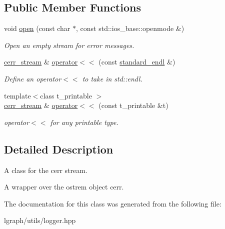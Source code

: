 \subsection*{Public Member Functions}
\begin{DoxyCompactItemize}
\item 
\hypertarget{classlgraph_1_1utils_1_1cerr__stream_aaec9df1b58756fcda596e29bbfcefeac}{void \hyperlink{classlgraph_1_1utils_1_1cerr__stream_aaec9df1b58756fcda596e29bbfcefeac}{open} (const char $\ast$, const std\-::ios\-\_\-base\-::openmode \&)}\label{classlgraph_1_1utils_1_1cerr__stream_aaec9df1b58756fcda596e29bbfcefeac}

\begin{DoxyCompactList}\small\item\em Open an empty stream for error messages. \end{DoxyCompactList}\item 
\hypertarget{classlgraph_1_1utils_1_1cerr__stream_afd3014b9b67c23c7c86513c0f4969723}{\hyperlink{classlgraph_1_1utils_1_1cerr__stream}{cerr\-\_\-stream} \& \hyperlink{classlgraph_1_1utils_1_1cerr__stream_afd3014b9b67c23c7c86513c0f4969723}{operator$<$$<$} (const \hyperlink{classlgraph_1_1utils_1_1cerr__stream_a3eda0896c5bf29dfcdee1640314baa36}{standard\-\_\-endl} \&)}\label{classlgraph_1_1utils_1_1cerr__stream_afd3014b9b67c23c7c86513c0f4969723}

\begin{DoxyCompactList}\small\item\em Define an operator$<$$<$ to take in std\-::endl. \end{DoxyCompactList}\item 
\hypertarget{classlgraph_1_1utils_1_1cerr__stream_afd9313105917714104d41bb3990ab81c}{{\footnotesize template$<$class t\-\_\-printable $>$ }\\\hyperlink{classlgraph_1_1utils_1_1cerr__stream}{cerr\-\_\-stream} \& \hyperlink{classlgraph_1_1utils_1_1cerr__stream_afd9313105917714104d41bb3990ab81c}{operator$<$$<$} (const t\-\_\-printable \&t)}\label{classlgraph_1_1utils_1_1cerr__stream_afd9313105917714104d41bb3990ab81c}

\begin{DoxyCompactList}\small\item\em operator$<$$<$ for any printable type. \end{DoxyCompactList}\end{DoxyCompactItemize}


\subsection{Detailed Description}
A class for the cerr stream. 

A wrapper over the ostrem object cerr. 

The documentation for this class was generated from the following file\-:\begin{DoxyCompactItemize}
\item 
lgraph/utils/logger.\-hpp\end{DoxyCompactItemize}
